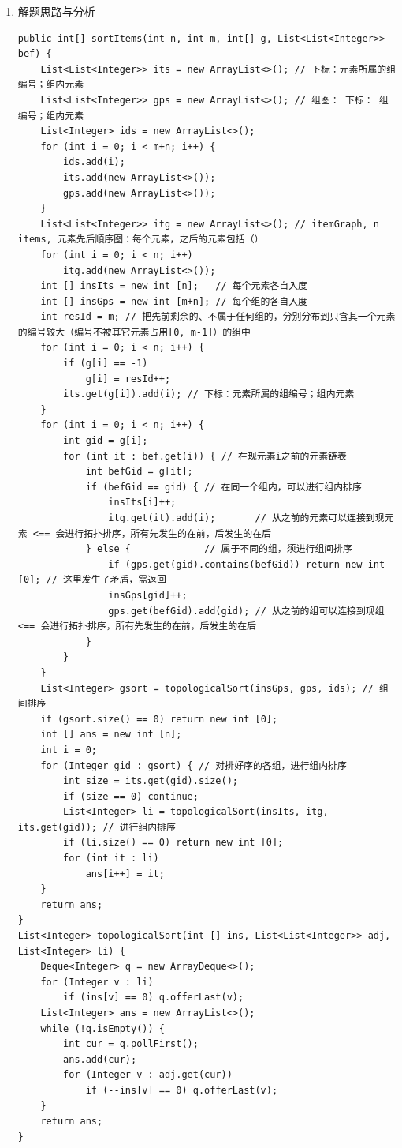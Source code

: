 \documentclass[9pt, b5paaper]{book}
\begin{document}
\begin{enumerate}
\item 解题思路与分析
\label{sec-1-1-2-1}
\begin{verbatim}
public int[] sortItems(int n, int m, int[] g, List<List<Integer>> bef) {
    List<List<Integer>> its = new ArrayList<>(); // 下标：元素所属的组编号；组内元素
    List<List<Integer>> gps = new ArrayList<>(); // 组图： 下标： 组编号；组内元素
    List<Integer> ids = new ArrayList<>();
    for (int i = 0; i < m+n; i++) {
        ids.add(i);
        its.add(new ArrayList<>());
        gps.add(new ArrayList<>());
    }
    List<List<Integer>> itg = new ArrayList<>(); // itemGraph, n items, 元素先后順序图：每个元素，之后的元素包括（）
    for (int i = 0; i < n; i++) 
        itg.add(new ArrayList<>());
    int [] insIts = new int [n];   // 每个元素各自入度
    int [] insGps = new int [m+n]; // 每个组的各自入度
    int resId = m; // 把先前剩余的、不属于任何组的，分别分布到只含其一个元素的编号较大（编号不被其它元素占用[0, m-1]）的组中
    for (int i = 0; i < n; i++) {
        if (g[i] == -1)
            g[i] = resId++;
        its.get(g[i]).add(i); // 下标：元素所属的组编号；组内元素
    }
    for (int i = 0; i < n; i++) {
        int gid = g[i];
        for (int it : bef.get(i)) { // 在现元素i之前的元素链表
            int befGid = g[it];
            if (befGid == gid) { // 在同一个组内，可以进行组内排序
                insIts[i]++;
                itg.get(it).add(i);       // 从之前的元素可以连接到现元素 <== 会进行拓扑排序，所有先发生的在前，后发生的在后
            } else {             // 属于不同的组，须进行组间排序
                if (gps.get(gid).contains(befGid)) return new int [0]; // 这里发生了矛盾，需返回
                insGps[gid]++;
                gps.get(befGid).add(gid); // 从之前的组可以连接到现组     <== 会进行拓扑排序，所有先发生的在前，后发生的在后
            }
        }
    }
    List<Integer> gsort = topologicalSort(insGps, gps, ids); // 组间排序
    if (gsort.size() == 0) return new int [0];
    int [] ans = new int [n];
    int i = 0;
    for (Integer gid : gsort) { // 对排好序的各组，进行组内排序
        int size = its.get(gid).size();
        if (size == 0) continue;
        List<Integer> li = topologicalSort(insIts, itg, its.get(gid)); // 进行组内排序
        if (li.size() == 0) return new int [0];
        for (int it : li) 
            ans[i++] = it;
    }
    return ans;
}
List<Integer> topologicalSort(int [] ins, List<List<Integer>> adj, List<Integer> li) {
    Deque<Integer> q = new ArrayDeque<>();
    for (Integer v : li) 
        if (ins[v] == 0) q.offerLast(v);
    List<Integer> ans = new ArrayList<>();
    while (!q.isEmpty()) {
        int cur = q.pollFirst();
        ans.add(cur);
        for (Integer v : adj.get(cur)) 
            if (--ins[v] == 0) q.offerLast(v);
    }
    return ans;
}
\end{verbatim}
\end{enumerate}
\end{document}
